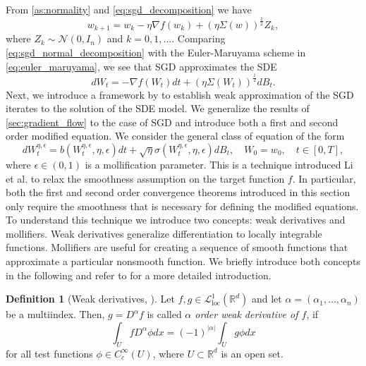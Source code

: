 \documentclass[12pt]{article}
\theoremstyle{definition}
\newtheorem{definition}[definition]{Definition}
\numberwithin{equation}{section}
\newcommand{\R}{\mathbb{R}}
\newcommand{\CL}{\mathcal{L}}
\newcommand{\CN}{\mathcal{N}}
\begin{document}
From \autoref{as:normality} and \eqref{eq:sgd_decomposition} we have
\begin{equation}
  \label{eq:sgd_normal_decomposition}
  w_{k+1} = w_{k} - \eta \nabla f(w_{k}) + (\eta \Sigma(w))^{\frac{1}{2}} Z_k,
\end{equation}
where $Z_k \sim \CN(0,I_n)$ and $k=0,1,\dots$. Comparing \eqref{eq:sgd_normal_decomposition} with the Euler-Maruyama scheme in \eqref{eq:euler_maruyama}, we see that SGD approximates the SDE
\begin{equation}
  dW_t = -\nabla f(W_t)dt + (\eta \Sigma(W_t))^{\frac{1}{2}}dB_t.
\end{equation}
Next, we introduce a framework by \autocite{liStochasticModifiedEquations2019} to establish weak approximation of the SGD iterates to the solution of the SDE model. We generalize the results of \autoref{sec:gradient_flow} to the case of SGD and introduce both a first and second order modified equation.
We consider the general class of equation of the form
\begin{equation}
  \label{eq:general_sde}
  dW^{\eta, \epsilon}_t = b(W^{\eta, \epsilon}_t, \eta, \epsilon)dt + \sqrt{\eta}\sigma(W^{\eta, \epsilon}_t, \eta, \epsilon)dB_t, \quad W_0 = w_0, \quad t \in [0,T],
\end{equation}
where $\epsilon \in (0,1)$ is a mollification parameter. This is a technique introduced Li et al. \cite{liStochasticModifiedEquations2019} to relax the smoothness assumption on the target function $f$. In particular, both the first and second order convergence theorems introduced in this section only require the smoothness that is necessary for defining the modified equations.
To understand this technique we introduce two concepts: weak derivatives and mollifiers. Weak derivatives generalize differentiation to locally integrable functions. Mollifiers are useful for creating a sequence of smooth functions that approximate a particular nonsmooth function. We briefly introduce both concepts in the following and refer to \cite{evansPartialDifferentialEquations2010} for a more detailed introduction.
\begin{definition}[Weak derivatives, ]
  Let $f,g \in \CL^1_{\text{loc}}(\R^d)$ and let $\alpha = (\alpha_1, \dots, \alpha_n)$ be a multiindex. Then, $g = D^{\alpha} f$ is called \emph{$\alpha$ order weak derivative of $f$}, if
  \begin{equation}
    \label{eq:weak_derivative}
    \int_U f D^{\alpha} \phi dx = (-1)^{|\alpha|} \int_U g \phi dx
  \end{equation}
  for all test functions $\phi \in C_c^{\infty}(U)$, where $U \subset \R^d$ is an open set.
\end{definition}
\end{document}
